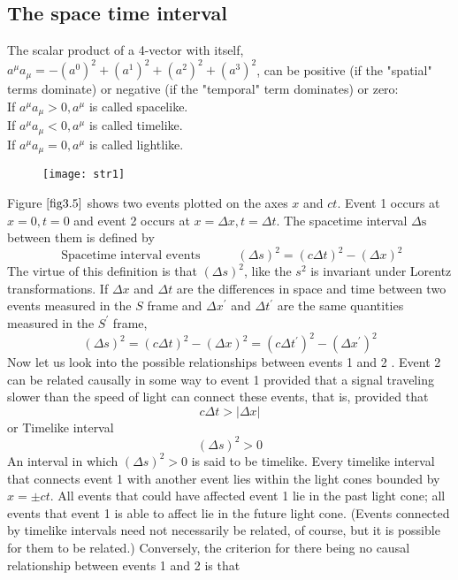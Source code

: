 \subsection{The space time interval} The scalar product of a 4-vector with itself, $a^{\mu} a_{\mu}=-\left(a^{0}\right)^{2}+\left(a^{1}\right)^{2}+\left(a^{2}\right)^{2}+\left(a^{3}\right)^{2}$, can be positive (if the "spatial" terms dominate) or negative (if the "temporal" term dominates) or zero:\\
If $a^{\mu} a_{\mu}>0, a^{\mu}$ is called spacelike.\\
If $a^{\mu} a_{\mu}<0, a^{\mu}$ is called timelike.\\
If $a^{\mu} a_{\mu}=0, a^{\mu}$ is called lightlike.
\begin{figure}[H]
	\centering
	\texttt{[image: str1]}
	\caption{}
	\label{fig3.5}
\end{figure}
 Figure $\ref{fig3.5}$ shows two events plotted on the axes $x$ and $c t$. Event 1 occurs at $x=0, t=0$ and event 2 occurs at $x=\Delta x, t=\Delta t$. The spacetime interval $\Delta \mathrm{s}$ between them is defined by\\
 $$\text{ Spacetime interval
 	events}\quad \quad \quad(\Delta s)^{2}=(c \Delta t)^{2}-(\Delta x)^{2}$$
 The virtue of this definition is that $(\Delta s)^{2}$, like the $s^{2}$  is invariant under Lorentz transformations. If $\Delta x$ and $\Delta t$ are the differences in space and time between two events measured in the $S$ frame and $\Delta x^{\prime}$ and $\Delta t^{\prime}$ are the same quantities measured in the $S^{\prime}$ frame,
$$(\Delta s)^{2}=(c \Delta t)^{2}-(\Delta x)^{2}=\left(c \Delta t^{\prime}\right)^{2}-\left(\Delta x^{\prime}\right)^{2}$$
Now let us look into the possible relationships between events 1 and 2 . Event 2 can be related causally in some way to event 1 provided that a signal traveling slower than the speed of light can connect these events, that is, provided that
$$
c \Delta t>|\Delta x|
$$
or
Timelike interval
$$(\Delta s)^{2}>0$$
An interval in which $(\Delta s)^{2}>0$ is said to be timelike. Every timelike interval that connects event 1 with another event lies within the light cones bounded by $x=\pm c t$. All events that could have affected event 1 lie in the past light cone; all events that event 1 is able to affect lie in the future light cone. (Events connected by timelike intervals need not necessarily be related, of course, but it is possible for them to be related.)
Conversely, the criterion for there being no causal relationship between events 1 and 2 is that
